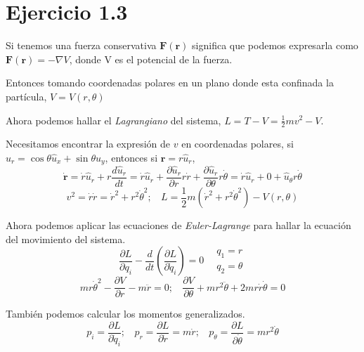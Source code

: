 \section{Ejercicio 1.3}


Si tenemos una fuerza conservativa $\mathbf{F}(\mathbf{r})$ significa que podemos expresarla como $\mathbf{F}(\mathbf{r})=-\nabla V$, donde V es el potencial de la fuerza.

Entonces tomando coordenadas polares en un plano donde esta confinada la partícula, $V=V(r,\theta)$

Ahora podemos hallar el \textit{Lagrangiano} del sistema, $L = T-V=\frac{1}{2}mv^2-V$.

Necesitamos encontrar la expresión de $v$ en coordenadas polares, si $\hat{u}_r=\cos{\theta} \hat{u}_x + \sin{\theta} \hat{u}_y$, entonces si $\mathbf{r}=r \hat{u}_r$, 
\[\dot{\mathbf{r}}=\dot{r} \hat{u}_r + r \frac{d \hat{u}_r}{dt}=\dot{r} \hat{u}_r + \frac{\partial \hat{u}_r}{\partial r} r\dot{r} + \frac{\partial \hat{u}_r}{\partial \theta} r\dot{\theta}=\dot{r} \hat{u}_r+0 + \hat{u}_{\theta} r\dot{\theta}\]
\[v^2=\dot{r}\dot{r}={\dot{r}}^2+r^2{\dot{\theta}}^2; \ \ \ \ L = \frac{1}{2}m({\dot{r}}^2+r^2{\dot{\theta}}^2)-V(r,\theta)\]


Ahora podemos aplicar las ecuaciones de \textit{Euler-Lagrange} para hallar la ecuación del movimiento del sistema.
\[\frac{\partial L}{\partial q_i}-\frac{d}{dt}\left(\frac{\partial L}{\partial \dot{q}_i}\right)=0 \ \ \ \ \begin{matrix}
    q_1= r \\ q_2 = \theta 
\end{matrix}\]
\[mr\dot{\theta}^2-\frac{\partial V}{\partial r}-m\ddot{r}=0; \ \ \ \ \frac{\partial V}{\partial \theta} + mr^2\ddot{\theta}+2mr\dot{r}\dot{\theta}=0\]

También podemos calcular los momentos generalizados.
\[p_i = \frac{\partial L}{\partial \dot{q}_i}; \ \ \ \ p_r = \frac{\partial L}{\partial \dot{r}}=m\dot{r}; \ \ \ \ p_{\theta} = \frac{\partial L}{\partial \dot{\theta}}=mr^2\dot{\theta}\]